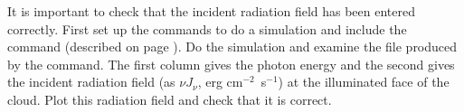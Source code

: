 It is important to check that the incident radiation field
has been entered correctly.
First set up the commands to do a simulation and include the  command
(described on page \pageref{sec:CommandSaveContinuum}).
Do the simulation and examine the
file produced by the  command.
The first column gives the
photon energy and the second gives the incident radiation field
(as $\nu J_{\nu}$, erg cm$^{-2}$~s$^{-1}$)
at the illuminated face of the cloud.
Plot this radiation field and check that it is correct.

